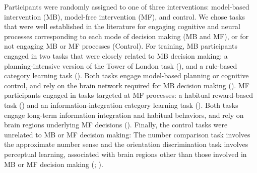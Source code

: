 \documentclass[11pt]{article} %
\begin{document}
Participants were randomly assigned to one of three interventions: model-based intervention (MB), model-free intervention (MF), and control. We chose tasks that were well established in the literature for engaging cognitive and neural processes corresponding to each mode of decision making (MB and MF), or for not engaging MB or MF processes (Control). For training, MB participants engaged in two tasks that were closely related to MB decision making: a planning-intensive version of the Tower of London task (\cite{beauchamp_dynamic_2003}), and a rule-based category learning task (\cite{maddox_dissociating_2004}). Both tasks engage model-based planning or cognitive control, and rely on the brain network required for MB decision making (\cite{dolan_goals_2013}).%
MF participants engaged in tasks targeted at MF processes: a habitual reward-based task (\cite{tricomi_value_2015}) and an information-integration category learning task (\cite{maddox_dissociating_2004}). Both tasks engage long-term information integration and habitual behaviors, and rely on brain regions underlying MF decisions (\cite{dolan_goals_2013}). %
Finally, the control tasks were unrelated to MB or MF decision making: The number comparison task involves the approximate number sense and the orientation discrimination task involves perceptual learning, associated with brain regions other than those involved in MB or MF decision making (\cite{piazza_neurocognitive_2010}; \cite{sasaki_advances_2010}). 
\end{document}
